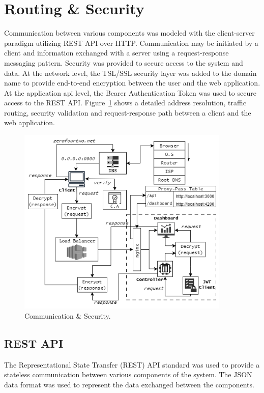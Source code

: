 \section{Routing \& Security}
Communication between various components was modeled with the client-server paradigm utilizing REST API over HTTP. Communication may be initiated
by a client and information exchanged with a server using a request-response messaging pattern.  
Security was provided to secure access to the system and data. At the network level, the TSL/SSL security layer was added to the domain name to 
provide end-to-end encryption between the user and the web application. At the application api level, the Bearer Authentication Token was used to 
secure access to the REST API. Figure~\ref{image:comm_sec} shows a detailed address resolution, traffic routing, security validation and 
request-response path between a client and the web application. 

\begin{figure}[h!]
    \includegraphics[width=0.9\textwidth]{images/comm_sec.png}
    \caption{Communication \& Security.}
    \label{image:comm_sec}
\end{figure}

\subsection{REST API}
The Representational State Transfer (REST) API standard was used to provide a stateless communication between various components of the system. 
The JSON data format was used to represent the data exchanged between the components. 


